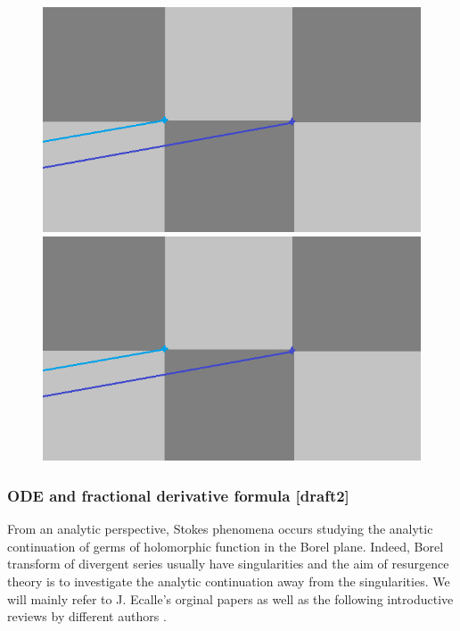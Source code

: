 \documentclass[11pt,a4paper,twoside,leqno,noamsfonts]{amsart}
\numberwithin{equation}{section}
\begin{document}
\begin{figure}[h]
\includegraphics[scale=0.33]{borel-left}
\includegraphics[scale=0.33]{borel-left}
\end{figure}    


\subsubsection{ ODE and fractional derivative formula [draft2]}

From an analytic perspective, Stokes phenomena occurs studying the analytic continuation of germs of holomorphic function in the Borel plane. Indeed, Borel transform of divergent series usually have singularities and the aim of resurgence theory is to investigate the analytic continuation away from the singularities. We will mainly refer to J. Ecalle's orginal papers \cite{EcalleI}\cite{EcalleII}\cite{EcalleIII} as well as the following introductive reviews by different authors \cite{Schiappa}\cite{Dorigoni}\cite{diablerets}\cite{MS16}\cite{sauzin_Gamma}.  
\end{document}
